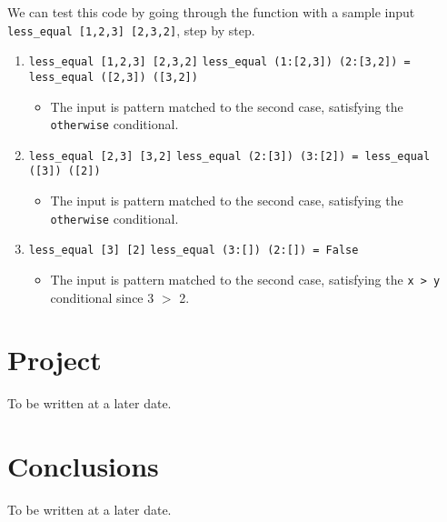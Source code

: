 \documentclass{article}
\theoremstyle{theorem}
\theoremstyle{definition}
\theoremstyle{remark}
\begin{document}
\noindent We can test this code by going through the function with a sample input \texttt{less\_equal [1,2,3] [2,3,2]}, step by step.

\begin{enumerate}[noitemsep]
    \item \texttt{less\_equal [1,2,3] [2,3,2]}
    \linebreak \texttt{less\_equal (1:[2,3]) (2:[3,2]) = less\_equal ([2,3]) ([3,2])}
    \begin{itemize}
        \item The input is pattern matched to the second case, satisfying the \texttt{otherwise} conditional.
    \end{itemize} 
    \item \texttt{less\_equal [2,3] [3,2]}
    \linebreak \texttt{less\_equal (2:[3]) (3:[2]) = less\_equal ([3]) ([2])}
    \begin{itemize}
        \item The input is pattern matched to the second case, satisfying the \texttt{otherwise} conditional.
    \end{itemize} 
    \item \texttt{less\_equal [3] [2]}
    \linebreak \texttt{less\_equal (3:[]) (2:[]) =  False}
    \begin{itemize}
        \item The input is pattern matched to the second case, satisfying the \texttt{x > y} conditional since 3 $>$ 2.
    \end{itemize} 
\end{enumerate}

\newpage %

\section{Project}

To be written at a later date.

\section{Conclusions}\label{conclusions}

To be written at a later date.
\end{document}
